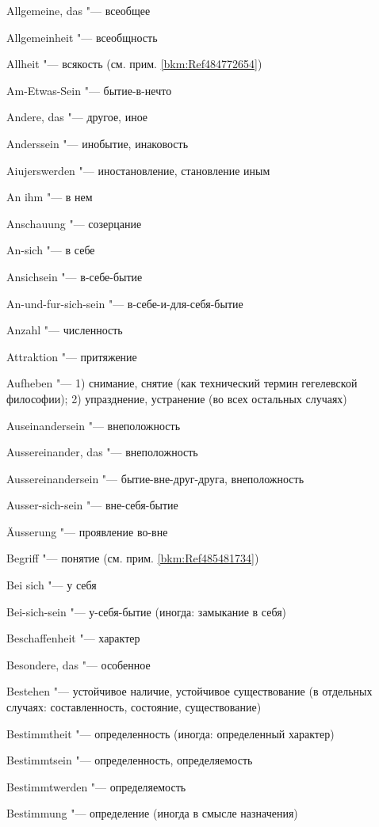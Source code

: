 \begin{multicols}{2}
Allgemeine, das "--- всеобщее

Allgemeinheit "--- всеобщность

Allheit "--- всякость (см. прим. \ref{bkm:Ref484772654})

Am-Etwas-Sein "--- бытие-в-нечто

Andere, das "--- другое, иное

Anderssein "--- инобытие, инаковость

Aiujerswerden "--- иностановление, становление иным

An ihm "--- в нем

Anschauung "--- созерцание

An-sich "--- в себе

Ansichsein "--- в-себе-бытие

An-und-fur-sich-sein "--- в-себе-и-для-себя-бытие

Anzahl "--- численность

Attraktion "--- притяжение

Aufheben "--- 1) снимание, снятие (как технический термин гегелевской
философии); 2) упразднение, устранение (во всех остальных случаях)

Auseinandersein "--- внеположность

Aussereinander, das "--- внеположность

Aussereinandersein "--- бытие-вне-друг-друга, внеположность

Ausser-sich-sein "--- вне-себя-бытие

Äusserung "--- проявление во-вне

\bigskip

Begriff "--- понятие (см. прим. \ref{bkm:Ref485481734})

Bei sich "--- у себя

Bei-sich-sein "--- у-себя-бытие (иногда: замыкание в себя)

Beschaffenheit "--- характер

Besondere, das "--- особенное

Bestehen "--- устойчивое наличие, устойчивое существование (в
отдельных случаях: составленность, состояние, существование)

Bestimmtheit "--- определенность (иногда: определенный характер)

Bestimmtsein "--- определенность, определяемость

Bestimmtwerden "--- определяемость

Bestimmung "--- определение (иногда в смысле назначения)


\end{multicols}
